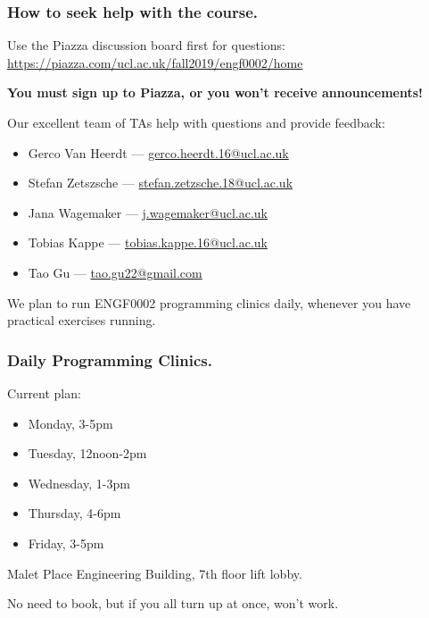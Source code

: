 \documentclass{beamer} %
\newcommand\emc[1]{\textcolor{midred}{\textbf{#1}}}
\begin{document}
\begin{frame}
\frametitle{How to seek help with the course.} 

Use the Piazza discussion board first for questions:\\
\url{https://piazza.com/ucl.ac.uk/fall2019/engf0002/home}

\vspace{1mm}
\emc{You must sign up to Piazza, or you won't receive announcements!}


\vspace{3mm}
Our excellent team of TAs help with questions and provide feedback:
\begin{itemize}
\item Gerco Van Heerdt --- \url{gerco.heerdt.16@ucl.ac.uk}
\item Stefan Zetszsche --- \url{stefan.zetzsche.18@ucl.ac.uk}
\item Jana Wagemaker --- \url{j.wagemaker@ucl.ac.uk}
\item Tobias Kappe --- \url{tobias.kappe.16@ucl.ac.uk}
\item Tao Gu --- \url{tao.gu22@gmail.com}
\end{itemize}

We plan to run ENGF0002 programming clinics daily, whenever you have practical
exercises running.
\end{frame}

\begin{frame}
  \frametitle{Daily Programming Clinics.}

  Current plan:
  \begin{itemize}
  \item Monday, 3-5pm
  \item Tuesday, 12noon-2pm
  \item Wednesday, 1-3pm
  \item Thursday, 4-6pm
  \item Friday, 3-5pm
  \end{itemize}

  Malet Place Engineering Building, 7th floor lift lobby.

  No need to book, but if you all turn up at once, won't work.
\end{frame}
\end{document}
